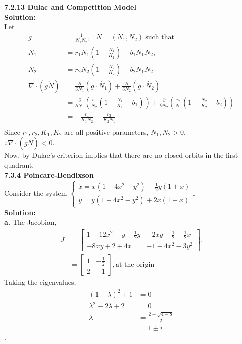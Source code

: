 \documentclass[12pt]{article}
\newcommand{\mycbox}[1]{\tikz{\path[draw=#1,fill=#1] (0,0) rectangle (.2cm,.2cm);}}
\begin{document}
{\bf 7.2.13 Dulac and Competition Model}\\
{\bf Solution:} \\
Let 
\begin{align*}
g &=\frac{1}{N_1 N_2},~~~ N=(N_1, N_2)~\text{such that}~\\ \dot{N_1} &=r_1 N_1(1-\frac{N_1}{K_1})-b_1N_1N_2,\\
\dot{N_2} &=r_2 N_2(1-\frac{N_2}{K_2})-b_2N_1N_2\\
\nabla \cdot \left(g \dot{N}\right)&=\frac{\partial}{\partial N_1}\left(g \cdot \dot{N_1}\right)+\frac{\partial}{\partial N_2}\left(g \cdot \dot{N_2}\right)\\
&=\frac{\partial}{\partial N_1}\left(\frac{r_1}{N_2}\left(1-\frac{N_1}{K_1}-b_1\right)\right)+\frac{\partial}{\partial N_2}\left(\frac{r_2}{N_1}\left(1-\frac{N_2}{K_2}-b_2\right)\right)\\
&=-\frac{r_1}{K_1 N_2}-\frac{r_2}{K_2 N_1}\\
\end{align*}
Since $r_1,r_2, K_1,K_2$ are all positive parameters, $N_1, N_2 >0.$\\
$\therefore \nabla \cdot \left(g \dot{N} \right)<0.$\\
Now, by Dulac's criterion implies that there are no closed orbits in the first quadrant. \mycbox{black}\\
{\bf 7.3.4 Poincare-Bendixson}\\
Consider the system
$\begin{cases}
\dot{x} = x(1-4x^2 - y^2) - \frac{1}{2}y(1+x)\\
\dot{y} = y(1-4x^2 -y^2) +2x(1+x)
\end{cases}$.\\
{\bf Solution:}\\
\indent
{\bf a. } The Jacobian,
\begin{align*}
J&=\begin{bmatrix}
1-12x^2-y-\frac{1}{2}y & -2xy - \frac{1}{2} -\frac{1}{2}x\\
-8xy +2 + 4x& -1 - 4x^2 - 3y^2
\end{bmatrix}. \\
&=\begin{bmatrix}
1 & - \frac{1}{2}\\
2 & -1 
\end{bmatrix}, \text{at the origin}
\end{align*}
Taking the eigenvalues, 
\begin{align*}
(1-\lambda)^2 + 1 &=0\\
\lambda^2 -2\lambda + 2 &=0\\
\lambda &= \frac{2 \pm \sqrt{4-8}}{2}\\
&= 1\pm i
\end{align*}.
\end{document}
